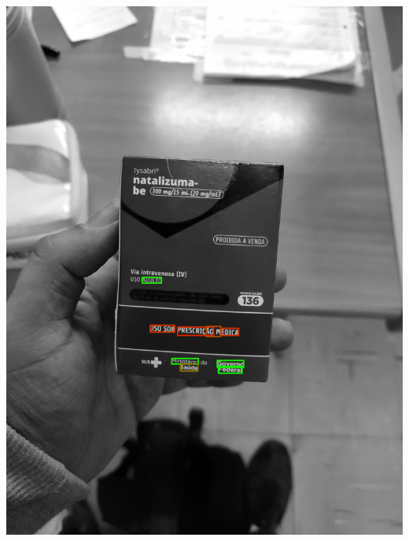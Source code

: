 \begin{frame}
\begin{columns}
\begin{column}{0.24\textwidth}
			\includegraphics[height=0.35\textheight]{../pictures/tysabri_rgb_b_only_boxes.jpg}
		\end{column}
	\end{columns}
\end{frame}


